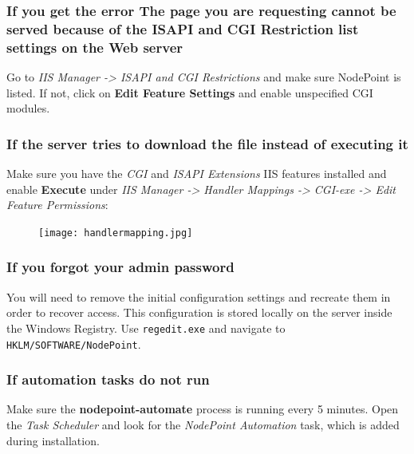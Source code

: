 \documentclass[11pt]{article}
\begin{document}
{\subsubsection{If you get the error The page you are requesting cannot be served because of the ISAPI and CGI Restriction list settings on the Web server}

Go to \textit{IIS Manager -> ISAPI and CGI Restrictions} and make sure NodePoint is listed. If not, click on \textbf{Edit Feature Settings} and enable unspecified CGI modules.

\subsubsection{If the server tries to download the file instead of executing it}

Make sure you have the \textit{CGI} and \textit{ISAPI Extensions} IIS features installed and enable \textbf{Execute} under \textit{IIS Manager -> Handler Mappings -> CGI-exe -> Edit Feature Permissions}:

\begin{figure}[h]
\texttt{[image: handlermapping.jpg]}
\end{figure}

\subsubsection{If you forgot your admin password}

You will need to remove the initial configuration settings and recreate them in order to recover access. This configuration is stored locally on the server inside the Windows Registry. Use \texttt{regedit.exe} and navigate to \texttt{HKLM/SOFTWARE/NodePoint}.

\subsubsection{If automation tasks do not run}

Make sure the \textbf{nodepoint-automate} process is running every 5 minutes. Open the \textit{Task Scheduler} and look for the \textit{NodePoint Automation} task, which is added during installation.
}
\end{document}
